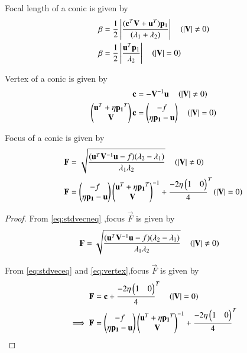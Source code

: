 \documentclass[journal,12pt,twocolumn]{IEEEtran}
\begin{document}
\begin{lemma}
Focal length of a conic is given by
\begin{align}
\beta &= \frac{1}{2}\left\vert\frac{(\mathbf{c}^T\mathbf{V}+\mathbf{u}^T)\mathbf{p}_1}{(\lambda_1+\lambda_2)}\right\vert \quad \left(\left\vert\mathbf{V}\right\vert \neq 0\right) \label{eq:foclenneq}
\\
\beta &= \frac{1}{2}\left\vert\frac{\mathbf{u}^T\mathbf{p}_1}{\lambda_2}\right\vert \quad \left(\left\vert\mathbf{V}\right\vert = 0\right) \label{eq:foclen} \end{align}
\end{lemma}

\begin{lemma}
Vertex of a conic is given by 
\begin{align}
\mathbf{c} &= -\mathbf{V}^{-1}\mathbf{u} \quad \left(\left\vert\mathbf{V}\right\vert \neq 0\right) \label{eq:vertexneq}
\\
\begin{pmatrix}\mathbf{u}^T + \eta\mathbf{p_1}^T \\ \mathbf{V}\end{pmatrix}\mathbf{c} &= \begin{pmatrix}-f \\ \eta\mathbf{p_1} - \mathbf{u}\end{pmatrix} \quad \left(\left\vert\mathbf{V}\right\vert = 0\right) \label{eq:vertex}
\end{align}
\end{lemma}

\begin{lemma}
Focus of a conic is given by 
\begin{align}
\mathbf{F} &= \sqrt{\frac{(\mathbf{u}^T\mathbf{V}^{-1}\mathbf{u}-f)(\lambda_2-\lambda_1)}{\lambda_1\lambda_2}} \quad \left(\left\vert\mathbf{V}\right\vert \neq 0\right) \label{eq:focusneq}
\\
\mathbf{F} &= \begin{pmatrix}-f \\ \eta\mathbf{p_1} - \mathbf{u}\end{pmatrix}{\ensuremath{\begin{pmatrix}\mathbf{u}^T + \eta\mathbf{p_1}^T \\ \mathbf{V}\end{pmatrix}}}^{-1}+{\frac{-2\eta\begin{pmatrix}1 & 0\end{pmatrix}}{4}}^{T} \left(\left\vert\mathbf{V}\right\vert = 0\right) \label{eq:focus}
\end{align}
\end{lemma}

\begin{proof}
From \eqref{eq:stdvecneq} ,focus $\vec{F}$ is given by
\begin{align}
\mathbf{F} &= \sqrt{\frac{(\mathbf{u}^T\mathbf{V}^{-1}\mathbf{u}-f)(\lambda_2-\lambda_1)}{\lambda_1\lambda_2}} \quad \left(\left\vert\mathbf{V}\right\vert \neq 0\right)
\end{align}

From \eqref{eq:stdveceq} and \eqref{eq:vertex},focus $\vec{F}$ is given by
\begin{align}
\mathbf{F} &= \mathbf{c} + {\frac{-2\eta\begin{pmatrix}1 & 0\end{pmatrix}}{4}}^{T} \quad \left(\left\vert\mathbf{V}\right\vert = 0\right)\\
\implies \mathbf{F} &= \begin{pmatrix}-f \\ \eta\mathbf{p_1} - \mathbf{u}\end{pmatrix}{\ensuremath{\begin{pmatrix}\mathbf{u}^T + \eta\mathbf{p_1}^T \\ \mathbf{V}\end{pmatrix}}}^{-1} + {\frac{-2\eta\begin{pmatrix}1 & 0\end{pmatrix}}{4}}^{T}
\end{align}
\end{proof}
\end{document}
